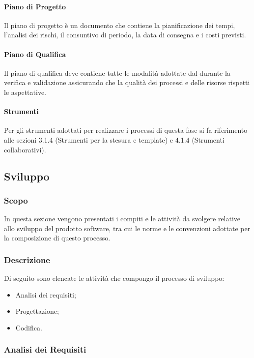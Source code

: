 \paragraph{Piano di Progetto}
Il piano di progetto è un documento che contiene la pianificazione dei tempi, l'analisi dei rischi, il consuntivo di periodo, la data di consegna e i costi previsti.

\paragraph{Piano di Qualifica}
Il piano di qualifica deve contiene tutte le modalità adottate dal \roleVerifier{} durante la verifica e validazione assicurando che la qualità dei processi e delle risorse rispetti le aspettative. 

\paragraph{Strumenti}
Per gli strumenti adottati per realizzare i processi di questa fase si fa riferimento alle sezioni 3.1.4 (Strumenti per la stesura e template) e 4.1.4 (Strumenti collaborativi).  

\subsection{Sviluppo}
\subsubsection{Scopo}
In questa sezione vengono presentati i compiti e le attività da svolgere relative allo sviluppo del prodotto software, tra cui le norme e le convenzioni adottate per la composizione di questo processo.

\subsubsection{Descrizione}
Di seguito sono elencate le attività che compongo il processo di sviluppo:
\begin{itemize}
\item Analisi dei requisiti;
\item Progettazione;
\item Codifica.
\end{itemize}

\subsubsection{Analisi dei Requisiti}
